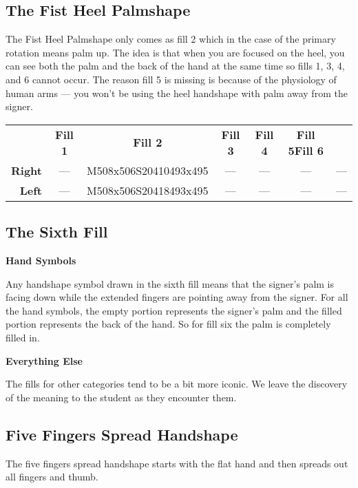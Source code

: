 \documentclass{article}
\begin{document}
\subsection{The Fist Heel Palmshape}

The Fist Heel Palmshape only comes as fill 2 which in the case of the primary rotation means palm up.
The idea is that when you are focused on the heel, you can see both the palm and the back of the hand at the same time so fills 1, 3, 4, and 6 cannot occur.
The reason fill 5 is missing is because of the physiology of human arms --- you won't be using the heel handshape with palm away from the signer.

\begin{center}
\begin{tabular}{r*{6}{c}}
&\textbf{Fill 1}&\textbf{Fill 2}&\textbf{Fill 3}&\textbf{Fill 4}&\textbf{Fill 5}\textbf{Fill 6}\\
\textbf{Right}&---&M508x506S20410493x495&---&---&---&---\\
\textbf{Left} &---&M508x506S20418493x495&---&---&---&---\\
\end{tabular}
\end{center}

\subsection{The Sixth Fill}

\noindent
\textbf{Hand Symbols}

Any handshape symbol drawn in the sixth fill means that the signer's palm is facing down while the extended fingers are pointing away from the signer.
For all the hand symbols, the empty portion represents the signer's palm and the filled portion represents the back of the hand.
So for fill six the palm is completely filled in.

\noindent
\textbf{Everything Else}

The fills for other categories tend to be a bit more iconic.
We leave the discovery of the meaning to the student as they encounter them.

\subsection{Five Fingers Spread Handshape}

The five fingers spread handshape starts with the flat hand and then spreads out all fingers and thumb.
\end{document}
